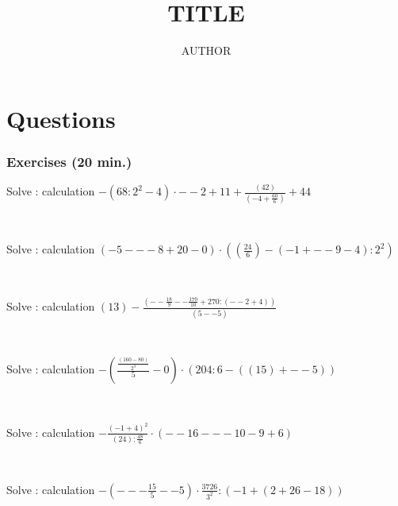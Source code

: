 \documentclass[english,course]{lecture}
\title{TITLE} \author{AUTHOR}
\begin{document}
\part{Questions }
\section{Exercises  (20 min.)}
\begin{enumerate}
\begin{minipage}{\linewidth}
\item Solve : calculation 
\(-\left(68:{2}^{2}-4\right) \cdot --2+11+\frac{\left(42\right)}{\left(-4+\frac{60}{6}\right)}+44\)
\end{minipage} \\
\begin{minipage}{\linewidth}
\item Solve : calculation 
\(\left(-5---8+20-0\right) \cdot \left(\left(\frac{24}{6}\right)-\left(-1+--9-4\right):{2}^{2}\right)\)
\end{minipage} \\
\begin{minipage}{\linewidth}
\item Solve : calculation 
\(\left(13\right)-\frac{\left(--\frac{18}{9}--\frac{170}{10}+270:\left(--2+4\right)\right)}{\left(5--5\right)}\)
\end{minipage} \\
\begin{minipage}{\linewidth}
\item Solve : calculation 
\(-\left(\frac{\frac{\left(160-80\right)}{{2}^{3}}}{5}-0\right) \cdot \left(204:6-\left(\left(15\right)+--5\right)\right)\)
\end{minipage} \\
\begin{minipage}{\linewidth}
\item Solve : calculation 
\(-\frac{{\left(-1+4\right)}^{2}}{\left(24\right):\frac{48}{6}} \cdot \left(--16---10-9+6\right)\)
\end{minipage} \\
\begin{minipage}{\linewidth}
\item Solve : calculation 
\(-\left(---\frac{15}{5}--5\right) \cdot \frac{3726}{{3}^{2}}:\left(-1+\left(2+26-18\right)\right)\)
\end{minipage} \\
\begin{minipage}{\linewidth}

\end{minipage}
\end{enumerate}
\end{document}
